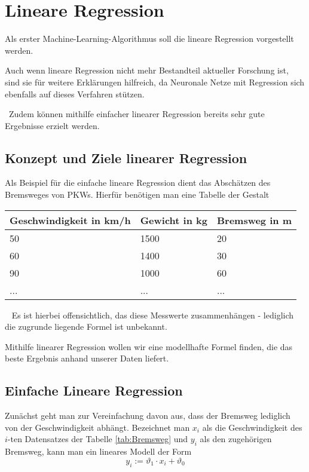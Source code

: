 \section{Lineare Regression}
\label{sec:LineareRegression}
Als erster Machine-Learning-Algorithmus soll die lineare Regression vorgestellt werden. 

Auch wenn lineare Regression nicht mehr Bestandteil aktueller Forschung ist, sind sie für weitere Erklärungen hilfreich, da Neuronale Netze mit Regression sich ebenfalls auf dieses Verfahren stützen. 

~\newline Zudem können mithilfe einfacher linearer Regression bereits sehr gute Ergebnisse erzielt werden.
\subsection{Konzept und Ziele linearer Regression}
Als Beispiel für die einfache lineare Regression dient das Abschätzen des Bremsweges von PKWs. Hierfür benötigen man eine Tabelle der Gestalt

\begin{center}
	\label{tab:Bremsweg}
	\begin{tabular}{|p{}|p{}|p{}|}
		\hline
		Geschwindigkeit in km/h & Gewicht in kg & Bremsweg in m  \\ \hline
		50& 1500 & 20 \\ \hline
		60& 1400 & 30 \\ \hline
		90& 1000 & 60 \\ \hline
		...& ... & ... \\ \hline
	\end{tabular}
\end{center}
~\newline
Es ist hierbei offensichtlich, das diese Messwerte zusammenhängen - lediglich die zugrunde liegende Formel ist unbekannt. 

Mithilfe linearer Regression wollen wir eine modellhafte Formel finden, die das beste Ergebnis anhand unserer Daten liefert.
\subsection{Einfache Lineare Regression}
Zunächst geht man zur Vereinfachung davon aus, dass der Bremsweg lediglich von der Geschwindigkeit abhängt. Bezeichnet man $x_i$ als die Geschwindigkeit des $i$-ten Datensatzes der Tabelle \ref{tab:Bremsweg} und $y_i$ als den zugehörigen Bremsweg, kann man ein lineares Modell der Form 
\begin{equation}
	y_i := \vartheta_1 \cdot x_i + \vartheta_0 
\end{equation}

